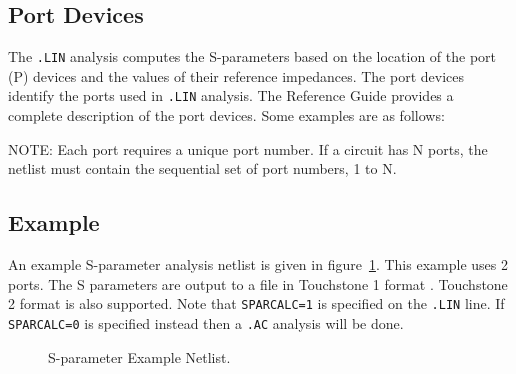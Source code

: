 \subsection{Port Devices}
\label{SP_Port}

The \verb|.LIN| analysis computes the S-parameters based on the
location of the port (P) devices and the values of their reference
impedances. The port devices identify the ports used in \verb|.LIN|
analysis. The \Xyce{} Reference Guide\ReferenceGuide{} provides a
complete description of the port devices. Some examples are as
follows:


NOTE: Each port requires a unique port number. If a circuit has N
ports, the netlist must contain the sequential set of port numbers, 1
to N.

\subsection{Example}
An example S-parameter analysis netlist is given in
figure~\ref{spExample}.  This example uses 2 ports.  The S parameters
are output to a file in Touchstone 1 format
\cite{touchstone2_std_2009}.  Touchstone 2 format is also supported.
Note that \texttt{SPARCALC=1} is specified on the \texttt{.LIN} line.
If \texttt{SPARCALC=0} is specified instead then a \texttt{.AC}
analysis will be done.

\begin{figure}[htbp]
  \begin{centering}
\caption[S-parameter Example Netlist]
{S-parameter Example Netlist.  \label{spExample} }
\end{centering}
\end{figure}

